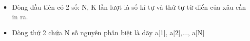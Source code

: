 \begin{itemize}
	\item     Dòng đầu tiên có 2 số: N, K lần lượt là số kí tự và thứ tự từ điển của xâu cần in ra.   
	\item     Dòng thứ 2 chứa N số nguyên phân biệt là dãy a[1], a[2],..., a[N]   
\end{itemize}